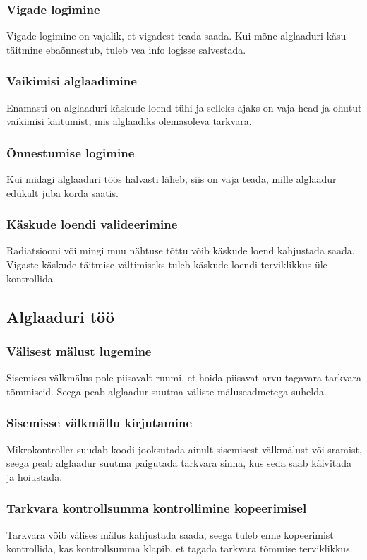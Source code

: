 \documentclass[12pt,a4paper]{article}
\begin{document}
\subsubsection{Vigade logimine}
Vigade logimine on vajalik, et vigadest teada saada. Kui mõne alglaaduri käsu
täitmine ebaõnnestub, tuleb vea info logisse salvestada.

\subsubsection{Vaikimisi alglaadimine}
Enamasti on alglaaduri käskude loend tühi ja selleks ajaks on vaja head ja
ohutut vaikimisi käitumist, mis alglaadiks olemasoleva tarkvara.

\subsubsection{Õnnestumise logimine}
Kui midagi alglaaduri töös halvasti läheb, siis on vaja teada, mille alglaadur
edukalt juba korda saatis.

\subsubsection{Käskude loendi valideerimine}
Radiatsiooni või mingi muu nähtuse tõttu võib käskude loend kahjustada saada.
Vigaste käskude täitmise vältimiseks tuleb käskude loendi terviklikkus üle
kontrollida.

\subsection{Alglaaduri töö}
\subsubsection{Välisest mälust lugemine}
Sisemises välkmälus pole piisavalt ruumi, et hoida piisavat arvu tagavara
tarkvara tõmmiseid. Seega peab alglaadur suutma väliste mäluseadmetega suhelda.

\subsubsection{Sisemisse välkmällu kirjutamine}
Mikrokontroller suudab koodi jooksutada ainult sisemisest välkmälust või
\gls{sram}ist, seega peab alglaadur suutma paigutada tarkvara sinna, kus seda saab
käivitada ja hoiustada.

\subsubsection{Tarkvara kontrollsumma kontrollimine kopeerimisel}
Tarkvara võib välises mälus kahjustada saada, seega tuleb enne kopeerimist
kontrollida, kas kontrollsumma klapib, et tagada tarkvara tõmmise terviklikkus.
\end{document}
